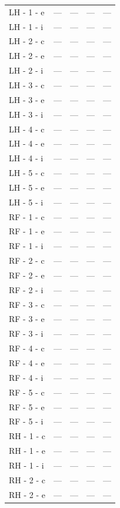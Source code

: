\documentclass[a4paper,11pt]{article}
\begin{document}
\begin{small}
\begin{longtable}{p{4.5cm}rrrr}
LH - 1 - e & --- & --- & --- & --- \\
LH - 1 - i & --- & --- & --- & --- \\
LH - 2 - c & --- & --- & --- & --- \\
LH - 2 - e & --- & --- & --- & --- \\
LH - 2 - i & --- & --- & --- & --- \\
LH - 3 - c & --- & --- & --- & --- \\
LH - 3 - e & --- & --- & --- & --- \\
LH - 3 - i & --- & --- & --- & --- \\
LH - 4 - c & --- & --- & --- & --- \\
LH - 4 - e & --- & --- & --- & --- \\
LH - 4 - i & --- & --- & --- & --- \\
LH - 5 - c & --- & --- & --- & --- \\
LH - 5 - e & --- & --- & --- & --- \\
LH - 5 - i & --- & --- & --- & --- \\
RF - 1 - c & --- & --- & --- & --- \\
RF - 1 - e & --- & --- & --- & --- \\
RF - 1 - i & --- & --- & --- & --- \\
RF - 2 - c & --- & --- & --- & --- \\
RF - 2 - e & --- & --- & --- & --- \\
RF - 2 - i & --- & --- & --- & --- \\
RF - 3 - c & --- & --- & --- & --- \\
RF - 3 - e & --- & --- & --- & --- \\
RF - 3 - i & --- & --- & --- & --- \\
RF - 4 - c & --- & --- & --- & --- \\
RF - 4 - e & --- & --- & --- & --- \\
RF - 4 - i & --- & --- & --- & --- \\
RF - 5 - c & --- & --- & --- & --- \\
RF - 5 - e & --- & --- & --- & --- \\
RF - 5 - i & --- & --- & --- & --- \\
RH - 1 - c & --- & --- & --- & --- \\
RH - 1 - e & --- & --- & --- & --- \\
RH - 1 - i & --- & --- & --- & --- \\
RH - 2 - c & --- & --- & --- & --- \\
RH - 2 - e & --- & --- & --- & --- \\

\end{longtable}
\end{small}
\end{document}
